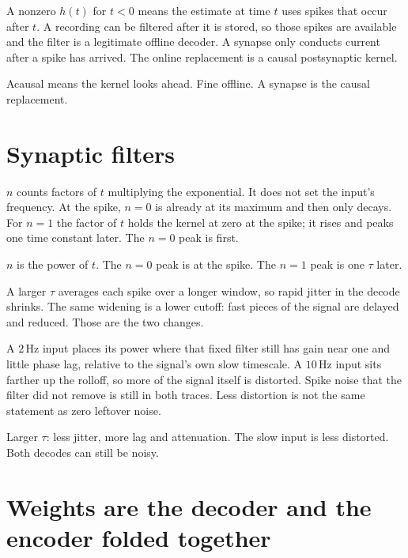 \documentclass[11pt,letterpaper]{article}
\newcommand{\ans}[1]{\par\vspace{2pt}{\bfseries #1}\quad}
\begin{document}
\ans{2.}
A nonzero \(h(t)\) for \(t < 0\) means the estimate at time \(t\) uses spikes that occur after \(t\). A recording can be filtered after it is stored, so those spikes are available and the filter is a legitimate offline decoder. A synapse only conducts current after a spike has arrived. The online replacement is a causal postsynaptic kernel.
\begin{result}
Acausal means the kernel looks ahead. Fine offline. A synapse is the causal replacement.
\end{result}

\section{Synaptic filters}

\ans{1.}
\(n\) counts factors of \(t\) multiplying the exponential. It does not set the input's frequency. At the spike, \(n = 0\) is already at its maximum and then only decays. For \(n = 1\) the factor of \(t\) holds the kernel at zero at the spike; it rises and peaks one time constant later. The \(n = 0\) peak is first.
\begin{result}
\(n\) is the power of \(t\). The \(n = 0\) peak is at the spike. The \(n = 1\) peak is one \(\tau\) later.
\end{result}

\ans{2.}
A larger \(\tau\) averages each spike over a longer window, so rapid jitter in the decode shrinks. The same widening is a lower cutoff: fast pieces of the signal are delayed and reduced. Those are the two changes.

A \(2\,\mathrm{Hz}\) input places its power where that fixed filter still has gain near one and little phase lag, relative to the signal's own slow timescale. A \(10\,\mathrm{Hz}\) input sits farther up the rolloff, so more of the signal itself is distorted. Spike noise that the filter did not remove is still in both traces. Less distortion is not the same statement as zero leftover noise.
\begin{result}
Larger \(\tau\): less jitter, more lag and attenuation. The slow input is less distorted. Both decodes can still be noisy.
\end{result}

\section{Weights are the decoder and the encoder folded together}
\end{document}
